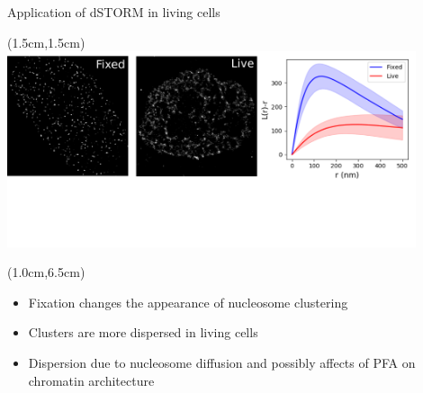 \documentclass{beamer}					%
\begin{document}
\begin{frame}{Application of dSTORM in living cells}
\begin{textblock*}{12cm}(1.5cm,1.5cm)
\includegraphics[width=12cm]{LiveFix}
\end{textblock*}
\begin{textblock*}{12cm}(1.0cm,6.5cm)
\begin{itemize}
\item Fixation changes the appearance of nucleosome clustering 
\item Clusters are more dispersed in living cells
\item Dispersion due to nucleosome diffusion and possibly affects of PFA on chromatin architecture
\end{itemize}
\end{textblock*}

\end{frame}

\end{document}
